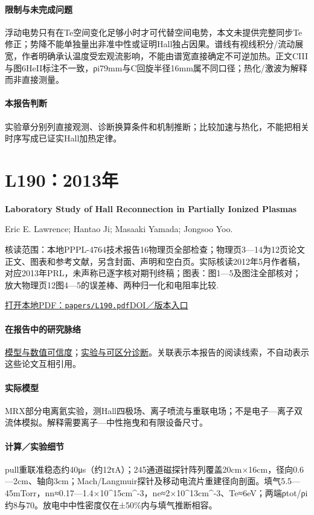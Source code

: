 \documentclass[UTF8,a4paper,11pt,openany,fontset=fandol]{ctexbook}
\begin{document}
\paragraph{限制与未完成问题}浮动电势只有在Te空间变化足够小时才可代替空间电势，本文未提供完整同步Te修正；势降不能单独量出非准中性或证明Hall独占因果。谱线有视线积分/流动展宽，作者明确承认温度受宏观流影响，不能由谱宽直接确定不可逆加热。正文CIII与图6HeII标注不一致，ρi79mm与C回旋半径16mm属不同口径；热化/激波为解释而非直接测量。

\paragraph{本报告判断}实验章分别列直接观测、诊断换算条件和机制推断；比较加速与热化，不能把相关时序写成已证实Hall加热定律。

\section{L190：2013年}\label{paper:L190}

\textbf{Laboratory Study of Hall Reconnection in Partially Ionized Plasmas}\citep{L190}\

Eric E. Lawrence;  Hantao Ji;  Masaaki Yamada;  Jongsoo Yoo.

\textsf{核读范围：}本地PPPL-4764技术报告16物理页全部检查；物理页3—14为12页论文正文、图表和参考文献，另含封面、声明和空白页。实际核读2012年5月作者稿，对应2013年PRL，未声称已逐字核对期刊终稿；\textsf{图表：}图1—5及图注全部核对；放大物理页12图4—5的误差棒、两种归一化和电阻率比较.

\href{run:../papers/L190.pdf}{打开本地PDF：\texttt{papers/L190.pdf}}\quad\href{https://doi.org/10.1103/physrevlett.110.015001}{DOI／版本入口}

\paragraph{在报告中的研究脉络}\hyperref[V1-ch:numerics]{模型与数值可信度}；\hyperref[story:diagnostic]{实验与可区分诊断}。关联表示本报告的阅读线索，不自动表示这些论文互相引用。

\paragraph{实际模型}MRX部分电离氦实验，测Hall四极场、离子喷流与重联电场；不是电子—离子双流体模拟。解释需要离子—中性拖曳和有限设备尺寸。

\paragraph{计算／实验细节}pull重联准稳态约40μs（约12τA）；245通道磁探针阵列覆盖20cm×16cm，径向0.6—2cm、轴向3cm；Mach/Langmuir探针及移动电流片重建径向剖面。填气5.5—45mTorr，nn≈0.17—1.4×10\textasciicircum{}15cm\textasciicircum{}-3，ne≈2×10\textasciicircum{}13cm\textasciicircum{}-3、Te≈6eV；两端ρtot/ρi约8与70。放电中中性密度仅在±50\%内与填气推断相容。
\end{document}
